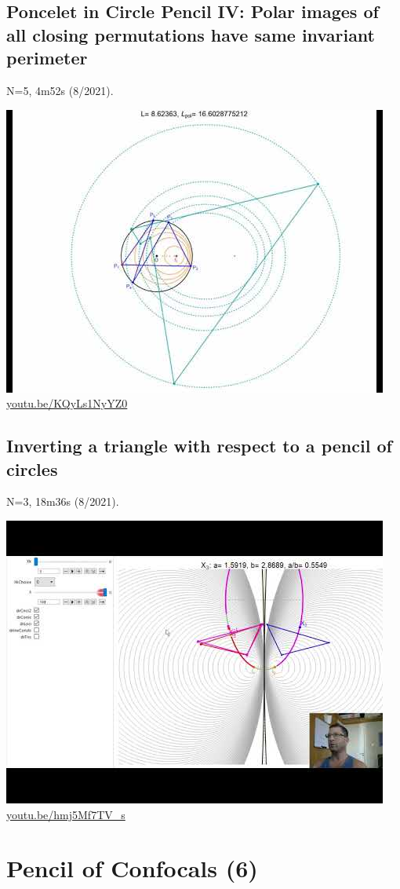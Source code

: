 \documentclass[12pt]{amsart}
\begin{document}
\subsection{Poncelet in Circle Pencil IV: Polar images of all closing permutations have same invariant perimeter}
\label{vid:KQyLs1NyYZ0}
\noindent N=5, 4m52s (8/2021). 
\begin{center}\includegraphics[width=.5\textwidth]{pics/KQyLs1NyYZ0.jpg} \\ 
\href{https://youtu.be/KQyLs1NyYZ0}{\url{youtu.be/KQyLs1NyYZ0}}\end{center}
% 
\subsection{Inverting a triangle with respect to a pencil of circles}
\label{vid:hmj5Mf7TV_s}
\noindent N=3, 18m36s (8/2021). 
\begin{center}\includegraphics[width=.5\textwidth]{pics/hmj5Mf7TV_s.jpg} \\ 
\href{https://youtu.be/hmj5Mf7TV_s}{\url{youtu.be/hmj5Mf7TV\_s}}\end{center}
% 

\section{Pencil of Confocals (6)}
\end{document}
